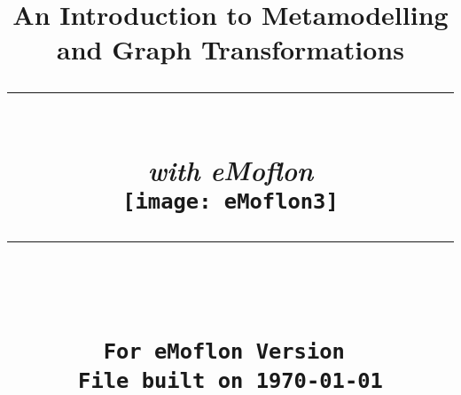 \title{
\flushright
{\LARGE\bfseries An Introduction to Metamodelling\\
and Graph Transformations}
\noindent\rule[-1ex]{\textwidth}{5pt}\\[2.5ex]
\hfill\emph{\LARGE\bfseries with eMoflon}\\
\center
\texttt{[image: eMoflon3]}
\flushleft
\noindent\rule[-1ex]{0.5\textwidth}{1.5pt}\\[1.5 ex]
\Large\bfseries \partTitle\\
{\small \texttt{For eMoflon Version \versionNumber}}\\
{\small \texttt{File built on \today}}\\    
} %

\date{}  
\author{} 